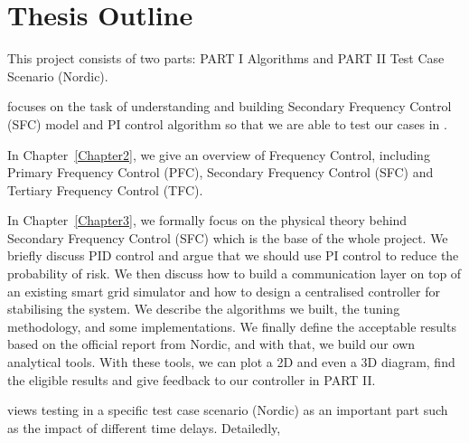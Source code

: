 \section{Thesis Outline} %
This project consists of two parts: PART I Algorithms and PART II Test Case Scenario (Nordic). 

 focuses on the task of understanding and building Secondary Frequency Control (SFC) model and PI control algorithm so that we are able to test our cases in .

\begin{description}
    \item In Chapter~\ref{Chapter2}, we give an overview of Frequency Control, including Primary Frequency Control (PFC), Secondary Frequency Control (SFC) and Tertiary Frequency Control (TFC). 
    \item In Chapter~\ref{Chapter3}, we formally focus on the physical theory behind Secondary Frequency Control (SFC) which is the base of the whole project. We briefly discuss PID control and argue that we should use PI control to reduce the probability of risk. We then discuss how to build a communication layer on top of an existing smart grid simulator and how to design a centralised controller for stabilising the system. We describe the algorithms we built, the tuning methodology, and some implementations. We finally define the acceptable results based on the official report from Nordic, and with that, we build our own analytical tools. With these tools, we can plot a 2D and even a 3D diagram, find the eligible results and give feedback to our controller in PART II.
\end{description}

 views testing in a specific test case scenario (Nordic) as an important part such as the impact of different time delays. Detailedly, 

